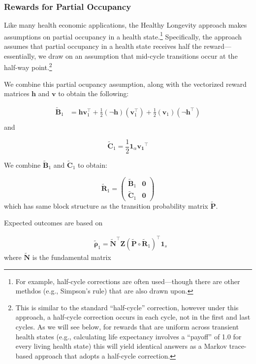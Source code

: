 \documentclass[
]{agujournal2019}
\begin{document}
\subsubsection{Rewards for Partial
Occupancy}\label{rewards-for-partial-occupancy}

Like many health economic applications, the Healthy Longevity approach
makes assumptions on partial occupancy in a health state.\footnote{For
  example, half-cycle corrections are often used---though there are
  other methdos (e.g., Simpson's rule) that are also drawn upon.}
Specifically, the approach assumes that partial occupancy in a health
state receives half the reward---essentially, we draw on an assumption
that mid-cycle transitions occur at the half-way point.\footnote{This is
  similar to the standard ``half-cycle'' correction, however under this
  approach, a half-cycle correction occurs in each cycle, not in the
  first and last cycles. As we will see below, for rewards that are
  uniform across transient health states (e.g., calculating life
  expectancy involves a ``payoff'' of 1.0 for every living health state)
  this will yield identical answers as a Markov trace-based approach
  that adopts a half-cycle correction.}

We combine this partial ocupancy assumption, along with the vectorized
reward matrices \(\mathbf{h}\) and \(\mathbf{v}\) to obtain the
following:

\[
\begin{aligned}
\tilde{\mathbf{B}}_{1} & =\mathbf{h} \mathbf{v}_{1}^{\top}+\frac{1}{2}(\neg \mathbf{h})\left(\mathbf{v}_{1}^{\top}\right)+\frac{1}{2}\left(\mathbf{v}_{1}\right)\left(\neg \mathbf{h}^{\top}\right) \\
\end{aligned}
\] and

\[
\tilde{\mathbf{C}}_{1}=\frac{1}{2} \mathbf{1}_{\alpha} \mathbf{v_1}^{\top}
\]

We combine \(\tilde{\mathbf{B}}_{1}\) and \(\tilde{\mathbf{C}}_{1}\) to
obtain:

\[
\tilde{\mathbf{R}}_{1}=\left(\begin{array}{c|c}
\tilde{\mathbf{B}}_{1} & \mathbf{0} \\
\hline \tilde{\mathbf{C}}_{1} & \mathbf{0}
\end{array}\right) 
\] which has same block structure as the transition probability matrix
\(\tilde{\mathbf{P}}\).

Expected outcomes are based on

\[
\begin{aligned}
& \tilde{\boldsymbol{\rho}}_{1}=\tilde{\mathbf{N}}^{\top} \mathbf{Z}\left(\tilde{\mathbf{P}} \circ \tilde{\mathbf{R}}_{1}\right)^{\top} \mathbf{1}_{s} 
\end{aligned}
\] where \(\tilde{\mathbf{N}}\) is the fundamental matrix
\end{document}
